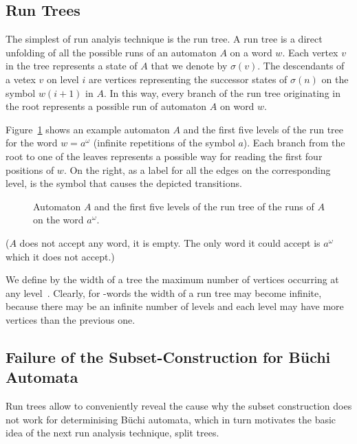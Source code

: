 \subsection{Run Trees}
The simplest of run analyis technique is the run tree. A run tree is a direct unfolding of all the possible runs of an automaton $A$ on a word $w$. Each vertex $v$ in the tree represents a state of $A$ that we denote by $\sigma(v)$. The descendants of a vetex $v$ on level $i$ are vertices representing the successor states of $\sigma(n)$ on the symbol $w(i+1)$ in $A$. In this way, every branch of the run tree originating in the root represents a possible run of automaton $A$ on word $w$.

Figure~\ref{run_tree} shows an example automaton $A$ and the first five levels of the run tree for the word $w = a^\omega$ (infinite repetitions of the symbol $a$). Each branch from the root to one of the leaves represents a possible way for reading the first four positions of $w$. On the right, as a label for all the edges on the corresponding level, is the symbol that causes the depicted transitions.

\begin{figure}
\begin{center}
\RunTree
\end{center}
\caption{Automaton $A$ and the first five levels of the run tree of the runs of $A$ on the word $a^\omega$.}
\label{run_tree}
\end{figure}

($A$ does not accept any word, it is empty. The only word it could accept is $a^\omega$ which it does not accept.)

We define by the width of a tree the maximum number of vertices occurring at any level~\cite{Muller199569}. Clearly, for \om-words the width of a run tree may become infinite, because there may be an infinite number of levels and each level may have more vertices than the previous one. 

\subsection{Failure of the Subset-Construction for Büchi Automata}
Run trees allow to conveniently reveal the cause why the subset construction does not work for determinising Büchi automata, which in turn motivates the basic idea of the next run analysis technique, split trees.


